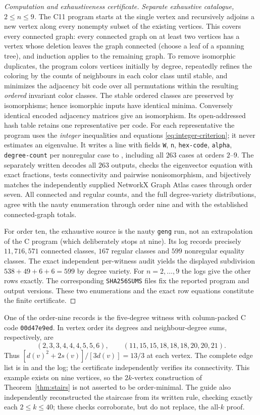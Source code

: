 \documentclass[11pt]{amsart}
\theoremstyle{remark}
\begin{document}
\begin{proof}[Computation and exhaustiveness certificate]
\emph{Separate exhaustive catalogue, $2\leq n\leq9$.}
The C11 program  starts at the
single vertex and recursively adjoins a new vertex along every
nonempty subset of the existing vertices. This covers every
connected graph: every connected graph on at least two
vertices has a vertex whose deletion leaves the graph
connected (choose a leaf of a spanning tree), and induction
applies to the remaining graph. To remove isomorphic duplicates,
the program colors vertices initially by degree, repeatedly
refines the coloring by the counts of neighbours in each color
class until stable, and minimizes the adjacency bit code over
all permutations within the resulting \emph{ordered} invariant
color classes. The stable ordered classes are preserved by
isomorphisms; hence isomorphic inputs have identical minima.
Conversely identical encoded adjacency matrices give an
isomorphism. Its open-addressed hash table retains one
representative per code. For each representative the program
uses the \emph{integer} inequalities and equations
\eqref{eq:integer-criterion}; it never estimates an eigenvalue.
It writes a line
with fields \texttt{W}, \texttt{n}, \texttt{hex-code}, \texttt{alpha}, \texttt{degree-count}
per nonregular case to ,
including all $263$ cases at orders $2$--$9$.
The separately written  decodes
all $263$ outputs, checks the eigenvector equation with exact
fractions, tests connectivity and pairwise nonisomorphism,
and bijectively matches the independently supplied NetworkX
Graph Atlas cases through order seven. All connected and
regular counts, and the full degree-variety distributions,
agree with the nauty enumeration through order nine and with
the established connected-graph totals.

For order ten, the exhaustive source is the nauty
\texttt{geng} run, not an extrapolation of the C program
(which deliberately stops at nine). Its log records precisely
$11{,}716{,}571$ connected classes, $167$ regular classes and
$599$ nonregular equality classes. The exact independent
per-witness audit yields the displayed subdivision
$538+49+6+6=599$ by degree variety. For $n=2,\ldots,9$
the logs give the other rows exactly. The corresponding
\texttt{SHA256SUMS} files fix the reported program and
output versions. These two enumerations and the exact
row equations constitute the finite certificate.
\end{proof}

One of the order-nine records is the five-degree witness with
column-packed C code \texttt{00d47e9ed}. In vertex order its degrees and
neighbour-degree sums, respectively, are
\[
 (2,3,3,4,4,4,5,5,6),\qquad
 (11,15,15,18,18,18,20,20,21).
\]
Thus $[d(v)^2+2s(v)]/[3d(v)]=13/3$ at each vertex.
The complete edge list is in
 and the log; the
certificate independently verifies its connectivity.
This example exists on nine vertices, so the $2k$-vertex
construction of Theorem~\ref{thm:stairs} is not asserted to be
order-minimal. The guide also independently reconstructed the
staircase from its written rule, checking exactly each
$2\leq k\leq40$; these checks corroborate, but do not
replace, the all-$k$ proof.
\end{document}
